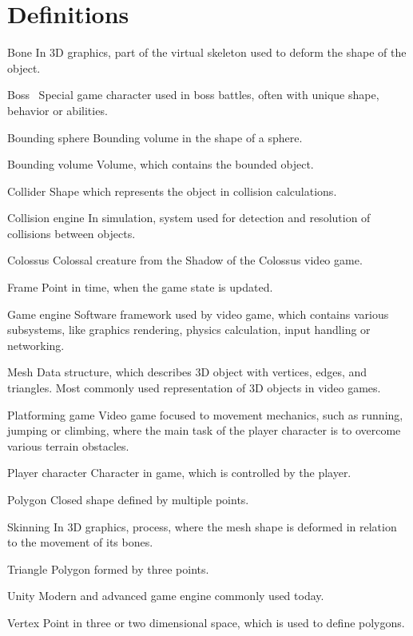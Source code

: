 \documentclass[a4paper]{article}
\newcommand{\specialsection}[1]
{
	\section*{#1}
	\addcontentsline{toc}{section}{\protect\numberline{}#1}
}
\newenvironment{definitions}
{\begin{description}[style=nextline]}
{\end{description}}
\begin{document}

\tableofcontents

\newpage
\listoffigures

\newpage

\setcounter{page}{4}

\specialsection{Definitions}

\begin{definitions}
	\item[Bone] In 3D graphics, part of the virtual skeleton used to deform the shape of the object.
	\item[Boss~] Special game character used in boss battles, often with unique shape, behavior or abilities.
	\item[Bounding sphere] Bounding volume in the shape of a sphere.
	\item[Bounding volume] Volume, which contains the bounded object.
	\item[Collider] Shape which represents the object in collision calculations.
	\item[Collision engine] In simulation, system used for detection and resolution of collisions between objects.
	\item[Colossus] Colossal creature from the Shadow of the Colossus video game.
	\item[Frame] Point in time, when the game state is updated.
	\item[Game engine] Software framework used by video game, which contains various subsystems, like graphics rendering, physics calculation, input handling or networking.
	\item[Mesh] Data structure, which describes 3D object with vertices, edges, and triangles. Most commonly used representation of 3D objects in video games.
	\item[Platforming game] Video game focused to movement mechanics, such as running, jumping or climbing, where the main task of the player character is to overcome various terrain obstacles.
	\item[Player character] Character in game, which is controlled by the player.
	\item[Polygon] Closed shape defined by multiple points.
	\item[Skinning] In 3D graphics, process, where the mesh shape is deformed in relation to the movement of its bones.
	\item[Triangle] Polygon formed by three points.
	\item[Unity] Modern and advanced game engine commonly used today.
	\item[Vertex] Point in three or two dimensional space, which is used to define polygons.

\end{definitions}
\end{document}
